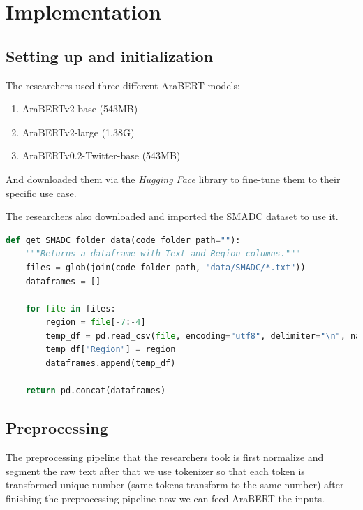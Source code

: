 \documentclass[12pt]{diazessay}
\begin{document}
    \section{Implementation }
    
    \subsection{Setting up and initialization} \label{txt:models}
    The researchers used three different AraBERT models\cite{antoun2020arabert}:
    \begin{enumerate}
        \item AraBERTv2-base (543MB)
        \item AraBERTv2-large (1.38G)
        \item AraBERTv0.2-Twitter-base (543MB)
    \end{enumerate}
    And downloaded them via the \emph{Hugging Face} library to fine-tune them to their specific use case.
    
    The researchers also downloaded and imported the SMADC dataset to use it.
    
    \begin{lstlisting}[language=Python, basicstyle=\footnotesize]
    def get_SMADC_folder_data(code_folder_path=""):
    """Returns a dataframe with Text and Region columns."""
    files = glob(join(code_folder_path, "data/SMADC/*.txt"))
    dataframes = []

    for file in files:
        region = file[-7:-4]
        temp_df = pd.read_csv(file, encoding="utf8", delimiter="\n", names=["Text"])
        temp_df["Region"] = region
        dataframes.append(temp_df)
    
    return pd.concat(dataframes)
    \end{lstlisting}
    
    \subsection{Preprocessing}
    The preprocessing pipeline that the researchers took is first normalize and segment the raw text after that we use tokenizer so that each token is transformed unique number (same tokens transform to the same number) after finishing the preprocessing pipeline now we can feed AraBERT the inputs.
\end{document}
